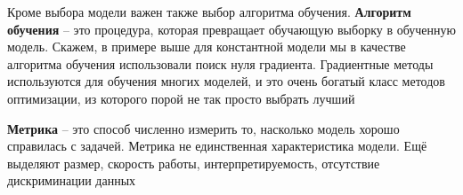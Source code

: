 Кроме выбора модели важен также выбор алгоритма обучения.
\textbf{Алгоритм обучения} -- это процедура, которая превращает обучающую выборку в обученную модель.
Скажем, в примере выше для константной модели мы в качестве алгоритма обучения использовали поиск нуля градиента.
Градиентные методы используются для обучения многих моделей, и это очень богатый класс методов оптимизации, из
которого порой не так просто выбрать лучший

\textbf{Метрика} -- это способ численно измерить то, насколько модель хорошо справилась с задачей.
Метрика не единственная характеристика модели.
Ещё выделяют размер, скорость работы, интерпретируемость, отсутствие дискриминации данных